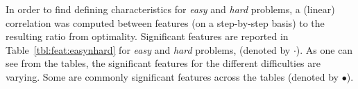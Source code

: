 \documentclass[10pt]{llncs} %
\newcommand{\hard}{\emph{hard} }
\newcommand{\easy}{\emph{easy} }
\begin{document}
\begin{table}[t!]
 {\tiny
 \begin{center}
 
 \end{center}}
 \caption{Features for \easy and \hard problems are drawn from the same data distribution (denoted by $\cdot$).}
 \label{tbl:feat:same}
\end{table}

In order to find defining characteristics for \easy and \hard problems, a (linear) correlation was computed between features (on a step-by-step basis) to the resulting ratio from optimality. Significant features are reported in Table~\ref{tbl:feat:easynhard} for \easy and \hard problems, (denoted by $\cdot$).
As one can see from the tables, the significant features for the different difficulties are varying. %
Some are commonly significant features across the tables (denoted by $\bullet$). %


\begin{table}[t!]
 {\tiny
 \begin{center}
 
 
 \end{center}}
 \caption{Significant correlation (denoted by $\cdot$) for \easy (left) and \hard (right) problems and resulting ratio from optimality, $\rho$  defined by~\eqref{eq:ratio}. Commonly significant features across the tables are denoted by $\bullet$.}
 \label{tbl:feat:easynhard}
\end{table}
\end{document}

